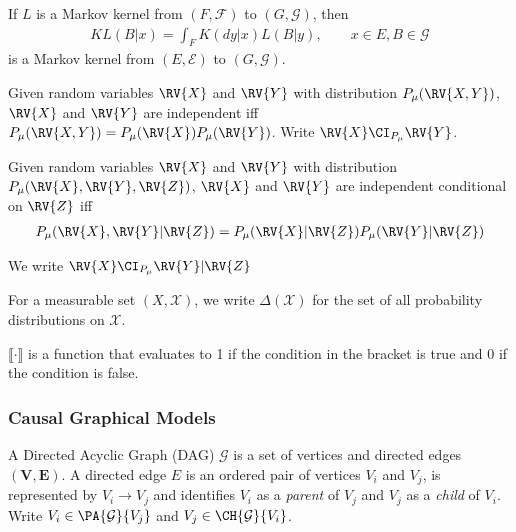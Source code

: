 \begin{definition}
\begin{definition}
If $L$ is a Markov kernel from $(F,\mathcal{F})$ to $(G,\mathcal{G})$, then
\begin{align}
    KL(B|x) = \int_F K(dy|x) L(B|y),\qquad x\in E, B\in \mathcal{G}
\end{align}
is a Markov kernel from $(E,\mathcal{E})$ to $(G,\mathcal{G})$. \cite{cinlar_probability_2011}
\end{definition}

\end{definition}

\begin{definition}[Independence]
Given random variables $\RV{X}$ and $\RV{Y}$ with distribution $P_\mu(\RV{X,Y})$, $\RV{X}$ and $\RV{Y}$ are independent iff $P_\mu(\RV{X,Y})=P_\mu(\RV{X})P_\mu(\RV{Y})$. Write $\RV{X}\CI_{P_\mu}\RV{Y}$.

\end{definition}

\begin{definition}


Given random variables $\RV{X}$ and $\RV{Y}$ with distribution $P_\mu(\RV{X},\RV{Y},\RV{Z})$, $\RV{X}$ and $\RV{Y}$ are independent conditional on $\RV{Z}$ iff 
\begin{align*}
    P_\mu(\RV{X},\RV{Y}|\RV{Z}) = P_\mu(\RV{X}|\RV{Z})P_\mu(\RV{Y}|\RV{Z})  
\end{align*}

We write $\RV{X}\CI_{P_\mu} \RV{Y} | \RV{Z}$
\end{definition}


\begin{definition}
For a measurable set $(X,\mathcal{X})$, we write $\Delta(\mathcal{X})$ for the set of all probability distributions on $\mathcal{X}$.
\end{definition}

\begin{definition}
$\llbracket \cdot \rrbracket$ is a function that evaluates to 1 if the condition in the bracket is true and 0 if the condition is false.
\end{definition}


\subsubsection{Causal Graphical Models}

\begin{definition}
A Directed Acyclic Graph (DAG) $\mathcal{G}$ is a set of vertices and directed edges $(\mathbf{V},\mathbf{E})$. A directed edge $E$ is an ordered pair of vertices $V_i$ and $V_j$, is represented by $V_i \to V_j$ and identifies $V_i$ as a \emph{parent} of $V_j$ and $V_j$ as a \emph{child} of $V_i$. Write $V_i\in \PA{\mathcal{G}}{V_j}$ and $V_j\in\CH{\mathcal{G}}{V_i}$.
\end{definition}

